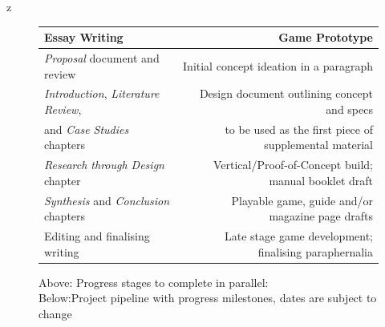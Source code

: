 \documentclass[12pt]{article}
\begin{document}
z
\begin{figure}[ht]\centering    
    \begin{tabular}{l | r} Essay Writing & Game Prototype                           \\\hline
        \textcolor{chap0}{\textit{Proposal} document and review}               
        &\textcolor{chap0}{Initial concept ideation in a paragraph}                 \\\hline
        \textcolor{chap1}{\textit{Introduction}, \textit{Literature Review}},  
        &\textcolor{chap1}{Design document outlining concept and specs}     \\
        \textcolor{chap1}{and \textit{Case Studies} chapters}                  
        &\textcolor{chap1}{to be used as the first piece of supplemental material} \\\hline
        \textcolor{chap2}{\textit{Research through Design} chapter}            
        &\textcolor{chap3}{Vertical/Proof-of-Concept build; manual booklet draft}   \\\hline
        \textcolor{chap3}{\textit{Synthesis} and \textit{Conclusion} chapters} 
        &\textcolor{chap3}{Playable game, guide and/or magazine page drafts}        \\\hline
        \textcolor{chap4}{Editing and finalising writing}                      
        &\textcolor{chap4}{Late stage game development; finalising paraphernalia}
    \end{tabular}   
    \caption{Above: Progress stages to complete in parallel:
        \\Below:Project pipeline with progress milestones, dates are subject to change}\vspace{8mm}
            

\end{figure}
\end{document}

